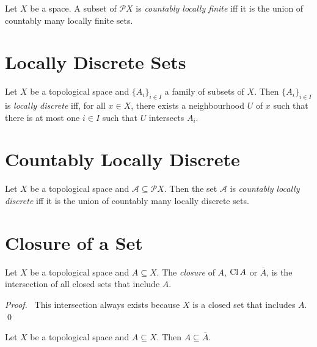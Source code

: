 \begin{df}
  Let $X$ be a space. A subset of $\mathcal{P} X$ is \emph{countably locally finite} iff it is the union of countably many locally finite sets.
\end{df}

\section{Locally Discrete Sets}

\begin{df}
Let $X$ be a topological space and $\{ A_i \}_{i \in I}$ a family of subsets of $X$. Then $\{ A_i \}_{i \in I}$ is \emph{locally discrete} iff, for all $x \in X$, there exists a neighbourhood $U$ of $x$ such that there is at most one $i \in I$ such that $U$ intersects $A_i$.
\end{df}

\section{Countably Locally Discrete}

\begin{df}
Let $X$ be a topological space and $\mathcal{A} \subseteq \mathcal{P} X$. Then the set $\mathcal{A}$ is \emph{countably locally discrete} iff it is the union of countably many locally discrete sets.
\end{df}

\section{Closure of a Set}

\begin{df}[Closure]
  Let $X$ be a topological space and $A \subseteq X$. The \emph{closure} of
  $A$, $\operatorname{Cl} A$ or $\overline{A}$, is the intersection of all closed sets that
  include $A$.
\end{df}

\begin{proof}
  \pf\ This intersection always exists because $X$ is a closed set that
  includes $A$. \qed
\end{proof}

\begin{prop}
  \label{prop:topology:closure:A_sub_Abar}
  Let $X$ be a topological space and $A \subseteq X$. Then $A \subseteq
  \overline{A}$.
\end{prop}

